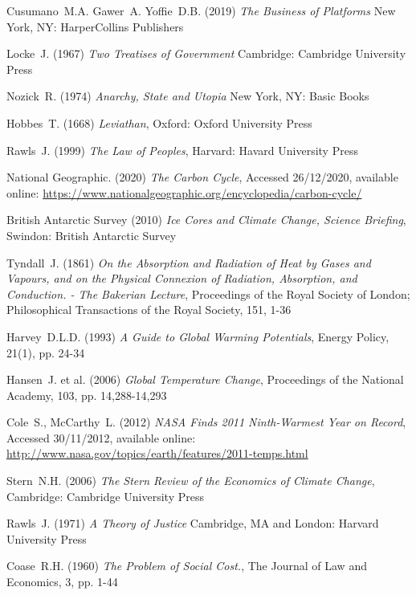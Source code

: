 \documentclass[11pt, oneside]{book}   	%
\begin{document}
\pagebreak

\begin{thebibliography}{99}

 Cusumano~M.A. Gawer~A. Yoffie~D.B. (2019)
\emph{The Business of Platforms}
New York, NY: HarperCollins Publishers

 Locke~J. (1967)
\emph{Two Treatises of Government}
Cambridge: Cambridge University Press

 Nozick~R. (1974)
\emph{Anarchy, State and Utopia}
New York, NY: Basic Books

 Hobbes~T. (1668)
\emph{Leviathan},
Oxford: Oxford University Press

 Rawls~J. (1999)
\emph{The Law of Peoples},
Harvard: Havard University Press

 National Geographic. (2020)
\emph{The Carbon Cycle},
Accessed 26/12/2020, available online: 
\url{https://www.nationalgeographic.org/encyclopedia/carbon-cycle/}
	
 British Antarctic Survey (2010)
\emph{Ice Cores and Climate Change, Science Briefing},
Swindon: British Antarctic Survey
	
 Tyndall~J. (1861)
\emph{On the Absorption and Radiation of Heat by Gases and Vapours, and on the Physical Connexion of Radiation, Absorption, and Conduction. - The Bakerian Lecture},
Proceedings of the Royal Society of London; Philosophical Transactions of the Royal Society, 151, 1-36
	
 Harvey~D.L.D. (1993)
\emph{A Guide to Global Warming Potentials},
Energy Policy, 21(1), pp. 24-34
	
 Hansen~J. et al. (2006)
\emph{Global Temperature Change},
Proceedings of the National Academy, 103, pp. 14,288-14,293
	
 Cole~S., McCarthy~L. (2012)
\emph{NASA Finds 2011 Ninth-Warmest Year on Record},
Accessed 30/11/2012, available online: 
\url{http://www.nasa.gov/topics/earth/features/2011-temps.html}
	
 Stern~N.H. (2006)
\emph{The Stern Review of the Economics of Climate Change},
Cambridge: Cambridge University Press
	
 Rawls~J. (1971)
\emph{A Theory of Justice}
Cambridge, MA and London: Harvard University Press
	
 Coase~R.H. (1960)
\emph{The Problem of Social Cost.},
The Journal of Law and Economics, 3, pp. 1-44
	

\end{thebibliography}
\end{document}
